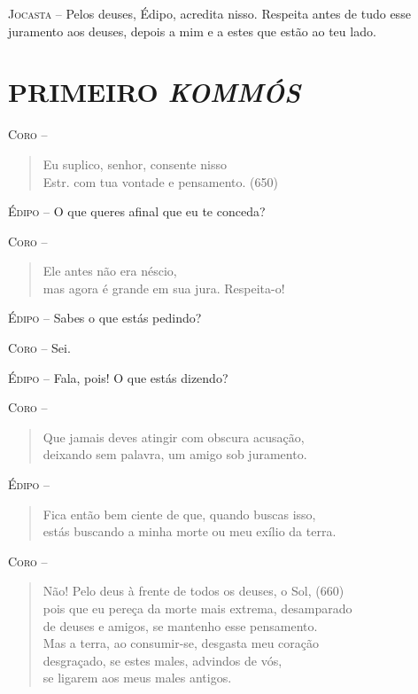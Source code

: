 \textsc{Jocasta} --   Pelos deuses, Édipo, acredita nisso. Respeita antes de tudo esse
juramento aos deuses, depois a mim e a estes que estão ao teu lado.

\section{PRIMEIRO \emph{KOMMÓS}}

\textsc{Coro} --  \begin{verse}Eu suplico, senhor, consente nisso\\ Estr.
com tua vontade e pensamento. (650)
\end{verse}

\textsc{Édipo} --   O que queres afinal que eu te conceda?

\textsc{Coro} -- \begin{verse}Ele antes não era néscio,\\
mas agora é grande em sua jura. Respeita-o!
\end{verse}

\textsc{Édipo} --   Sabes o que estás pedindo?

\textsc{Coro} --   Sei.

\textsc{Édipo} --   Fala, pois! O que estás dizendo?

\textsc{Coro} -- \begin{verse}Que jamais deves atingir com obscura acusação,\\
deixando sem palavra, um amigo sob juramento.
\end{verse}

\textsc{Édipo} -- \begin{verse}Fica então bem ciente de que, quando buscas isso,\\
estás buscando a minha morte ou meu exílio da terra.
\end{verse}

\textsc{Coro} -- \begin{verse}Não! Pelo deus à frente de todos os deuses, o Sol, (660)\\
pois que eu pereça da morte mais extrema, desamparado\\
de deuses e amigos, se mantenho esse pensamento.\\
Mas a terra, ao consumir-se, desgasta meu coração\\
desgraçado, se estes males, advindos de vós,\\
se ligarem aos meus males antigos.
\end{verse}

